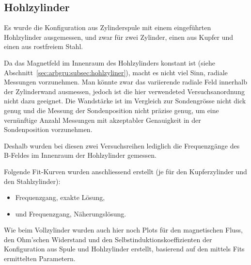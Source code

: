 \clearpage
\subsection{Hohlzylinder}
\label{sec:ausw:subsec:hohlz}


Es  wurde  die  Konfiguration   aus  Zylinderspule  mit  einem  eingef\"uhrten
Hohlzylinder ausgemessen, und  zwar f\"ur zwei Zylinder, einen  aus Kupfer und
einen aus rostfreiem Stahl.

Da  das  Magnetfeld  im  Innenraum   des  Hohlzylinders  konstant  ist  (siehe
Abschnitt~\ref{sec:arbgru:subsec:hohlzyliner}),  macht  es  nicht  viel  Sinn,
radiale  Messungen  vorzunehmen. Man  k\"onnte zwar  das  variierende  radiale
Feld innerhalb  der Zylinderwand  ausmessen, jedoch  ist die  hier verwendeted
Versuchsanordnung nicht  dazu geeignet. Die Wandst\"arke ist  im Vergleich zur
Sondengr\"osse  nicht dick  genug  und die  Messung  der Sondenposition  nicht
pr\"azise  genug,  um  eine  vern\"unftige Anzahl  Messungen  mit  akzeptabler
Genauigkeit in der Sondenposition vorzunehmen.

Deshalb wurden  bei diesen  zwei Versuchsreihen lediglich  die Frequenzg\"ange
des B-Feldes im Innenraum der Hohlzylinder gemessen.

Folgende Fit-Kurven wurden anschliessend  erstellt (je f\"ur den Kupferzylinder
und den Stahlzylinder):
\begin{itemize}
    \item
        Frequenzgang, exakte L\"osung,
    \item
        und Frequenzgang, N\"aherungsl\"osung.
\end{itemize}

Wie  beim Vollzylinder  wurden auch  hier  noch Plots  f\"ur den  magnetischen
Fluss,  den Ohm'schen  Widerstand  und  den Selbstinduktionskoeffizienten  der
Konfiguration aus Spule  und Hohlzylinder erstellt, basierend  auf den mittels
Fits ermittelten Parametern.


